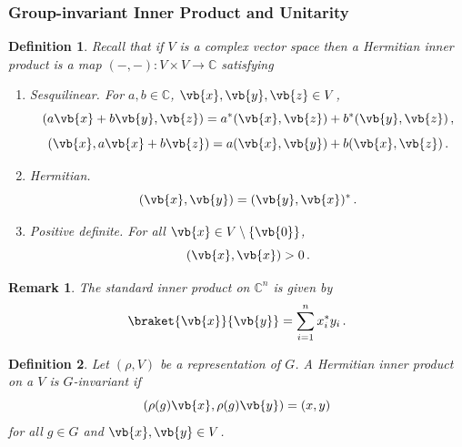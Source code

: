 \documentclass{article}
\theoremstyle{plain}\theoremheaderfont{\normalfont\itshape}\theorembodyfont{\rmfamily}\theoremseparator{.}\newtheorem*{rem}{Remark}\newtheorem*{ex}{Example}\newtheorem*{proof}{Proof}\newtheorem*{altp}{Alternative proof}
\theoremstyle{plain}\theoremheaderfont{\normalfont\bfseries}\theorembodyfont{\rmfamily}\theoremseparator{.}\newtheorem{thm}{Theorem}[section]\newtheorem{lem}[thm]{Lemma}\newtheorem{prop}[thm]{Proposition}\newtheorem*{cor}{Corollary}\newtheorem{defn}[thm]{Definition}\newtheorem{clm}[thm]{Claim}\newtheorem{clminproof}{Claim}
\theoremstyle{break}\theoremheaderfont{\normalfont\itshape}\theorembodyfont{\rmfamily}\theoremseparator{.\medskip}\newtheorem*{proofskip}{Proof}\newtheorem*{exs}{Examples}\newtheorem*{rems}{Remarks}
\theoremstyle{break}\theoremheaderfont{\normalfont\bfseries}\theorembodyfont{\rmfamily}\theoremseparator{.\medskip}\newtheorem{lemskip}[thm]{Lemma}\newtheorem{defnskip}[thm]{Definition}\newtheorem{propskip}[thm]{Proposition}\newtheorem{thmskip}[thm]{Theorem}
\numberwithin{equation}{section}
\begin{document}
	\subsubsection{Group-invariant Inner Product and Unitarity}
	\begin{defn}
		Recall that if \(V\) is a complex vector space then a \textit{Hermitian inner product} is a map \((-, -): V \times V \to\mathbb{C}\) satisfying
		\begin{enumerate}[topsep=0pt]
			\item \textit{Sesquilinear.} For \(a,b\in\mathbb{C}\), \(\vb{x},\vb{y},\vb{z}\in V\),
			\[(a\vb{x}+b\vb{y},\vb{z})=a^*(\vb{x},\vb{z})+b^*(\vb{y},\vb{z})\,,\]
			\[(\vb{x},a\vb{x}+b\vb{z})=a(\vb{x},\vb{y})+b(\vb{x},\vb{z})\,.\]
			\item \textit{Hermitian.}
			\[(\vb{x},\vb{y})=(\vb{y},\vb{x})^*\,.\]
			\item \textit{Positive definite.} For all \(\vb{x}\in V\setminus\{\vb{0}\}\),
			\[(\vb{x},\vb{x})>0\,.\]
		\end{enumerate}
	\end{defn}
	\begin{rem}
		The standard inner product on \(\mathbb{C}^n\) is given by
		\[\braket{\vb{x}}{\vb{y}}=\sum_{i=1}^{n}x_i^*y_i\,.\]
	\end{rem}
	\begin{defn}
		Let \((\rho,V)\) be a representation of \(G\). A Hermitian inner product on a \(V\) is \textit{\(G\)-invariant} if 
		\[(\rho(g)\vb{x}, \rho(g)\vb{y})=(x, y)\]
		for all \(g\in G\) and \(\vb{x},\vb{y}\in V\).
	\end{defn}
\end{document}
